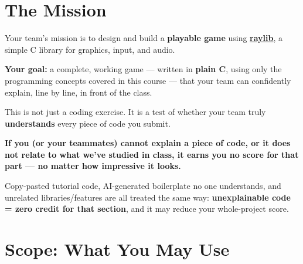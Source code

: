 \documentclass[11pt]{article}
\begin{document}
\assignmentheader

\section*{The Mission}

Your team's mission is to design and build a \textbf{playable game} using
\href{https://www.raylib.com/}{\textbf{raylib}}, a simple C library for graphics, input, and audio.

\textbf{Your goal:} a complete, working game --- written in \textbf{plain C}, using only the
programming concepts covered in this course --- that your team can confidently explain, line by
line, in front of the class.

This is not just a coding exercise. It is a test of whether your team truly \textbf{understands}
every piece of code you submit.

\begin{rulebox}
\textbf{If you (or your teammates) cannot explain a piece of code, or it does not relate to what
we've studied in class, it earns you no score for that part --- no matter how impressive it looks.}

\medskip
Copy-pasted tutorial code, AI-generated boilerplate no one understands, and unrelated
libraries/features are all treated the same way: \textbf{unexplainable code = zero credit for
that section}, and it may reduce your whole-project score.
\end{rulebox}

\section*{Scope: What You May Use}
\end{document}
